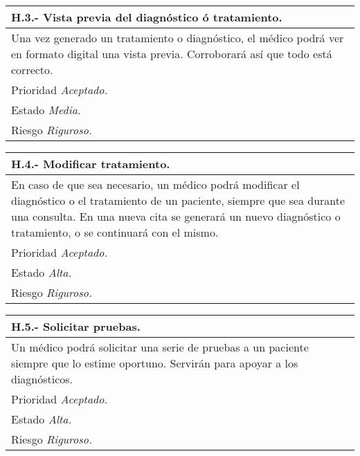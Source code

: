 \documentclass[a4paper,oneside,11pt]{book}
\begin{document}
\begin{center}
\begin{tabulary}{15cm}{|L|}
	\hline
		\bf{H.3.- Vista previa del diagnóstico ó tratamiento.} \\
	\hline
		Una vez generado un tratamiento o diagnóstico, el médico podrá ver en formato digital una vista previa. Corroborará así que todo está correcto. \\
	\hline
		Prioridad \textit{Aceptado.} \\
	\hline
		Estado \textit{Media.} \\
	\hline
		Riesgo \textit{Riguroso.} \\
	\hline
\end{tabulary}
\end{center}

\begin{center}
\begin{tabulary}{15cm}{|L|}
	\hline
		\bf{H.4.- Modificar tratamiento.} \\
	\hline
			En caso de que sea necesario, un médico podrá modificar el diagnóstico o el tratamiento de un paciente, siempre que sea durante una consulta. En una nueva cita se generará un nuevo diagnóstico o tratamiento, o se continuará con el mismo. \\
	\hline
		Prioridad \textit{Aceptado.} \\
	\hline
		Estado \textit{Alta.} \\
	\hline
		Riesgo \textit{Riguroso.} \\
	\hline
\end{tabulary}
\end{center}

\begin{center}
\begin{tabulary}{15cm}{|L|}
	\hline
		\bf{H.5.- Solicitar pruebas.} \\
	\hline
		Un médico podrá solicitar una serie de pruebas a un paciente siempre que lo estime oportuno. Servirán para apoyar a los diagnósticos. \\
	\hline
		Prioridad \textit{Aceptado.} \\
	\hline
		Estado \textit{Alta.} \\
	\hline
		Riesgo \textit{Riguroso.} \\
	\hline
\end{tabulary}
\end{center}
\end{document}
